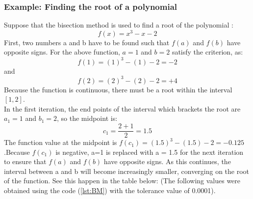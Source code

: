 \documentclass[a4paper, 12pt]{report}
\begin{document}
    \subsubsection{Example: Finding the root of a polynomial}
    Suppose that the bisection method is used to find a root of the polynomial :
    \begin{equation}
      f(x) = x^{3} - x - 2  
    \end{equation}
    First, two numbers a and b have to be found such that $f(a)$ and $f(b)$ have opposite signs. For the above function, $a=1$ and $b=2$ satisfy the criterion, as:
    \begin{equation}
      f(1) = (1)^{3} - (1) - 2  = -2
    \end{equation}
    and 
    \begin{equation}
      f(2) = (2)^{3} - (2) - 2  = +4
    \end{equation}
    Because the function is continuous, there must be a root within the interval $[1, 2]$.\\
    In the first iteration, the end points of the interval which brackets the root are $a_{1} = 1$ and $b_{1} = 2$, so the midpoint is:
    \begin{equation}
      c_{1} = \frac{2+1}{2} = 1.5
    \end{equation}
    The function value at the midpoint is $f(c_{1}) = (1.5)^{3} - (1.5) - 2 = -0.125$.Because $f(c_{1})$ is negative, a=1 is replaced with a = 1.5 for the next iteration to ensure that $f(a)$ and $f(b)$ have opposite signs. As this continues, the interval between a and b will become increasingly smaller, converging on the root of the function. See this happen in the table below: (The following values were obtained using the code (\ref{lst:BM}) with the tolerance value of 0.0001).
\end{document}
